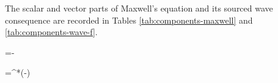 \noindent The scalar and vector parts of Maxwell's equation and its sourced wave consequence are recorded in Tables \ref{tab:components-maxwell} and \ref{tab:components-wave-f}.
\begin{componenttable}{\pv{\partial} =\rho-\cdot\sigv}
\end{componenttable}

\begin{componenttable}{\Box {}=\pv{\partial}^{*}(\rho-\cdot\sigv)}
\end{componenttable}
